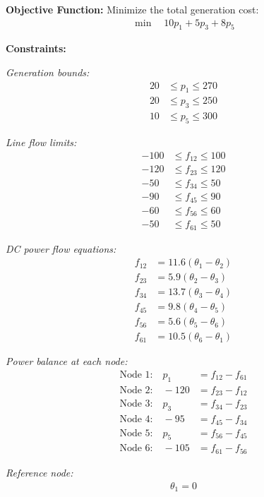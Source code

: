 \documentclass[11pt]{article}
\begin{document}
\begin{enumerate}
\textbf{Objective Function:}
Minimize the total generation cost:
\begin{align}
\min \quad 10p_1 + 5p_3 + 8p_5
\end{align}

\textbf{Constraints:}

\emph{Generation bounds:}
\begin{align}
20 &\leq p_1 \leq 270 \\
20 &\leq p_3 \leq 250 \\
10 &\leq p_5 \leq 300
\end{align}

\emph{Line flow limits:}
\begin{align}
-100 &\leq f_{12} \leq 100 \\
-120 &\leq f_{23} \leq 120 \\
-50 &\leq f_{34} \leq 50 \\
-90 &\leq f_{45} \leq 90 \\
-60 &\leq f_{56} \leq 60 \\
-50 &\leq f_{61} \leq 50
\end{align}

\emph{DC power flow equations:}
\begin{align}
f_{12} &= 11.6(\theta_1 - \theta_2) \\
f_{23} &= 5.9(\theta_2 - \theta_3) \\
f_{34} &= 13.7(\theta_3 - \theta_4) \\
f_{45} &= 9.8(\theta_4 - \theta_5) \\
f_{56} &= 5.6(\theta_5 - \theta_6) \\
f_{61} &= 10.5(\theta_6 - \theta_1)
\end{align}

\emph{Power balance at each node:}
\begin{align}
\text{Node 1:} \quad p_1 &= f_{12} - f_{61} \\
\text{Node 2:} \quad -120 &= f_{23} - f_{12} \\
\text{Node 3:} \quad p_3 &= f_{34} - f_{23} \\
\text{Node 4:} \quad -95 &= f_{45} - f_{34} \\
\text{Node 5:} \quad p_5 &= f_{56} - f_{45} \\
\text{Node 6:} \quad -105 &= f_{61} - f_{56}
\end{align}

\emph{Reference node:}
\begin{align}
\theta_1 = 0
\end{align}


\end{enumerate}
\end{document}
